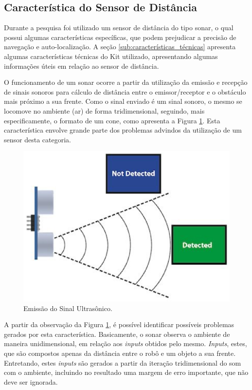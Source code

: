 \subsection{Característica do Sensor de Distância}
\label{sub:caracteristica_sensor}

  Durante a pesquisa foi utilizado um sensor de distância do tipo sonar, o qual possui algumas características específicas, que podem
  prejudicar a precisão de navegação e auto-localização. A seção \ref{sub:características_técnicas} apresenta algumas características
  técnicas do Kit utilizado, apresentando algumas informações úteis em relação ao sensor de distância.

  O funcionamento de um sonar ocorre a partir da utilização da emissão e recepção de sinais sonoros para cálculo de distância entre
  o emissor/receptor e o obstáculo mais próximo a sua frente. Como o sinal enviado é um sinal sonoro, o mesmo se locomove no ambiente (ar)
  de forma tridimensional, seguindo, mais especificamente, o formato de um cone, como apresenta a Figura \ref{img:conee}. Esta característica
  envolve grande parte dos problemas advindos da utilização de um sensor desta categoria.

  \begin{figure}[H]
    \centering
    \includegraphics[scale=0.7]{figuras/cone2.eps}
    \caption{Emissão do Sinal Ultrasônico.}
    \label{img:conee}
  \end{figure}

  A partir da observação da Figura \ref{img:conee}, é possível identificar possíveis problemas gerados por esta característica. Basicamente,
  o sonar observa o ambiente de maneira unidimensional, em relação aos \textit{inputs} obtidos pelo mesmo. \textit{Inputs}, estes,
  que são compostos apenas da distância entre o robô e um objeto a sua frente. Entretando, estes \textit{inputs} são gerados a partir
  da iteração tridimensional do som com o ambiente, incluindo no resultado uma margem de erro importante, que não deve ser ignorada.


